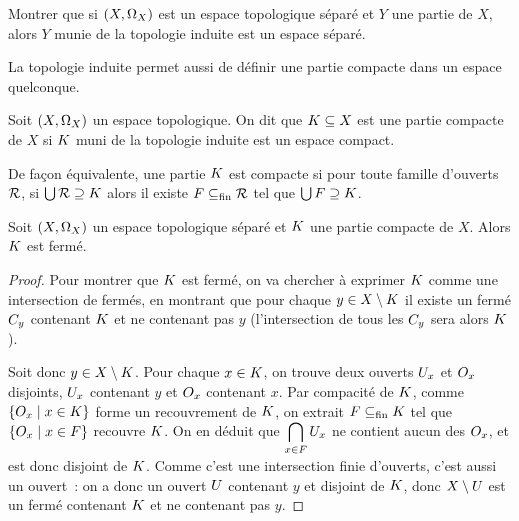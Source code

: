\begin{exercise}
  Montrer que si $(X,\Omega_{X})$ est un espace topologique séparé et $Y$ une
  partie de $X$, alors $Y$ munie de la topologie induite est un espace séparé.
\end{exercise}

\noindent
La topologie induite permet aussi de définir une partie compacte dans un espace
quelconque.

\begin{definition}
  Soit $(X,\Omega_{X})$ un espace topologique. On dit que
  $K\subseteq X$ est une partie compacte de $X$ si $K$ muni de la
  topologie induite est un espace compact.
\end{definition}

\begin{remark}
  De façon équivalente, une partie $K$ est compacte si pour toute famille
  d'ouverts $\mathcal R$, si $\bigcup \mathcal R \supseteq K$ alors il
  existe $F\subseteq_{\mathrm{fin}} \mathcal R$ tel que $\bigcup F \supseteq K$.
\end{remark}

\begin{property}
  Soit $(X,\Omega_{X})$ un espace topologique séparé et $K$ une partie
  compacte de $X$. Alors $K$ est fermé.
\end{property}

\begin{proof}
  Pour montrer que $K$ est fermé, on va chercher à exprimer $K$ comme
  une intersection de fermés, en montrant que pour chaque
  $y\in X\setminus K$ il
  existe un fermé $C_y$ contenant $K$ et ne contenant pas $y$
  (l'intersection de tous les $C_y$ sera alors $K$).

  Soit donc $y\in X\setminus K$. Pour chaque $x\in K$, on trouve deux
  ouverts $U_x$ et $O_x$ disjoints,
  $U_x$ contenant $y$ et $O_x$ contenant $x$. Par
  compacité de $K$, comme $\left\{ O_x \;\middle\vert\; x \in K \right\}$
  forme un recouvrement de $K$,
  on extrait $F\subseteq_{\mathrm{fin}} K$ tel que $\left\{ O_x \;\middle\vert\; x \in F \right\}$
  recouvre $K$.
  On en déduit que $\displaystyle\bigcap_{x\in F}U_x$ ne contient aucun des
  $O_x$, et est donc disjoint de $K$. Comme c'est une intersection
  finie d'ouverts, c'est aussi un ouvert~: on a donc un ouvert $U$
  contenant $y$ et disjoint de $K$, donc $X\setminus U$ est un fermé
  contenant $K$ et ne contenant pas $y$.
\end{proof}

